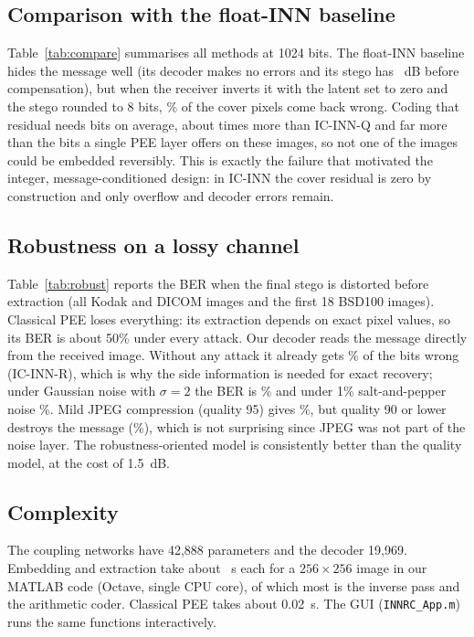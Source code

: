 \subsection{Comparison with the float-INN baseline}
Table~\ref{tab:compare} summarises all methods at 1024 bits. The float-INN baseline hides the message well (its decoder
makes no errors and its stego has \pinnBASE{}~dB before compensation), but when the receiver inverts it with the latent
set to zero and the stego rounded to 8 bits, \resBASE\% of the cover pixels come back wrong. Coding that residual needs
\auxBASE{} bits on average, about \auxRatio{} times more than IC-INN-Q and far more than the
\capPEE{} bits a single PEE layer offers on these images, so not one of the \nImgs{} images could be embedded
reversibly. This is exactly the failure that motivated the integer, message-conditioned design: in IC-INN the cover
residual is zero by construction and only overflow and decoder errors remain.



\subsection{Robustness on a lossy channel}\label{sec:robust}
Table~\ref{tab:robust} reports the BER when the final stego is distorted before extraction (all Kodak and DICOM images
and the first 18 BSD100 images). Classical PEE loses everything: its extraction depends on exact pixel values, so its BER
is about 50\% under every attack. Our decoder reads the message directly from the received image. Without any attack it
already gets \robnonezeroR\% of the bits wrong (IC-INN-R), which is why the side information is needed for exact recovery;
under Gaussian noise with $\sigma=2$ the BER is \robgausstwoR\% and under 1\% salt-and-pepper noise \robspsponeR\%. Mild
JPEG compression (quality 95) gives \robjpegnfR\%, but quality 90 or lower destroys the message (\robjpegninetyR\%), which is
not surprising since JPEG was not part of the noise layer. The robustness-oriented model is consistently better than the
quality model, at the cost of 1.5~dB.



\subsection{Complexity}
The coupling networks have 42{,}888 parameters and the decoder 19{,}969. Embedding and extraction take about
\tembQfour{}~s each for a $256\times256$ image in our MATLAB code (Octave, single CPU core), of which most is the inverse
pass and the arithmetic coder. Classical PEE takes about 0.02~s. The GUI (\texttt{INNRC\_App.m}) runs the same functions
interactively.
